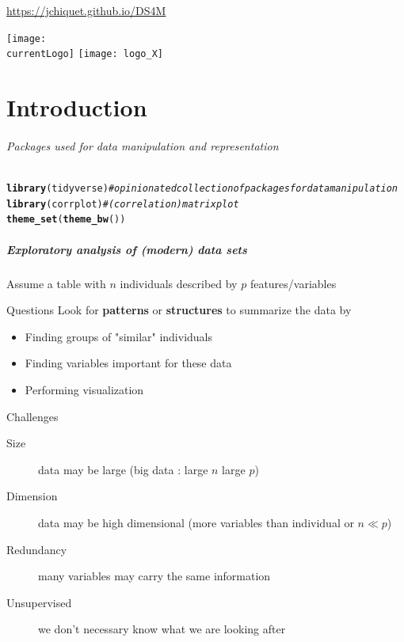 \documentclass{beamer}\usepackage[]{graphicx}\usepackage[]{color}
\title{\currentCourse}
\subtitle{\huge\currentChapter\normalsize}
\institute{\currentInstitute}
\date{\currentDate}
\makeatletter
\newcommand{\hlcom}[1]{\textcolor[rgb]{0.678,0.584,0.686}{\textit{#1}}}%
\newcommand{\hlstd}[1]{\textcolor[rgb]{0.345,0.345,0.345}{#1}}%
\newcommand{\hlkwd}[1]{\textcolor[rgb]{0.737,0.353,0.396}{\textbf{#1}}}%
\newenvironment{kframe}{%
 \def\at@end@of@kframe{}%
 \ifinner\ifhmode%
  \def\at@end@of@kframe{\end{minipage}}%
  \begin{minipage}{\columnwidth}%
 \fi\fi%
 \def\FrameCommand##1{\hskip\@totalleftmargin \hskip-\fboxsep
 \colorbox{shadecolor}{##1}\hskip-\fboxsep
     \hskip-\linewidth \hskip-\@totalleftmargin \hskip\columnwidth}%
 \MakeFramed {\advance\hsize-\width
   \@totalleftmargin\z@ \linewidth\hsize
   \@setminipage}}%
 {\par\unskip\endMakeFramed%
 \at@end@of@kframe}
\newenvironment{knitrout}{}{} %
\def\currentLogo{../common_figs/logo_HEC}
\newcommand{\dotitlepage}{%
  \begin{frame}
    \titlepage
    \vfill
    \begin{center}
        \scriptsize\url{https://jchiquet.github.io/DS4M}
    \end{center}
    \vfill
    \texttt{[image: \\currentLogo]}\hfill
    \texttt{[image: logo\_X]}
  \end{frame}
}
\makeatother
\begin{document}
\dotitlepage

\part{Introduction}
\begin{frame}[fragile]
  \partpage

\paragraph{Packages used for data manipulation and representation}
\begin{knitrout}\scriptsize
{}\color{fgcolor}\begin{kframe}
\begin{alltt}
\hlkwd{library}\hlstd{(tidyverse)}    \hlcom{# opinionated collection of packages for data manipulation}
\hlkwd{library}\hlstd{(corrplot)}     \hlcom{# (correlation) matrix plot}
\hlkwd{theme_set}\hlstd{(}\hlkwd{theme_bw}\hlstd{())}
\end{alltt}
\end{kframe}
\end{knitrout}
\end{frame}


\begin{frame}
  \frametitle{Exploratory analysis of (modern) data sets}

  Assume a table with $n$ individuals described by $p$ features/variables
  
  \vfill
  
  \begin{block}{Questions}
    Look for \alert{\bf patterns} or \alert{\bf structures} to summarize the data by
    \begin{itemize}
      \item Finding \alert{groups} of "similar" individuals
      \item Finding variables \alert{important} for these data
      \item Performing \alert{visualization}
    \end{itemize}
  \end{block}

  \vfill

  \begin{block}{Challenges}
    \begin{description}
      \item[Size] data may be \alert{large} (\og big data \og: large $n$ large $p$)    
      \item[Dimension] data may be \alert{high dimensional} (more variables than individual or $n \ll p$)    
      \item[Redundancy] many variables may carry the \alert{same information}
      \item[Unsupervised] we \alert{don't necessary know} what we are looking after
    \end{description}
  \end{block}

\end{frame}
\end{document}
